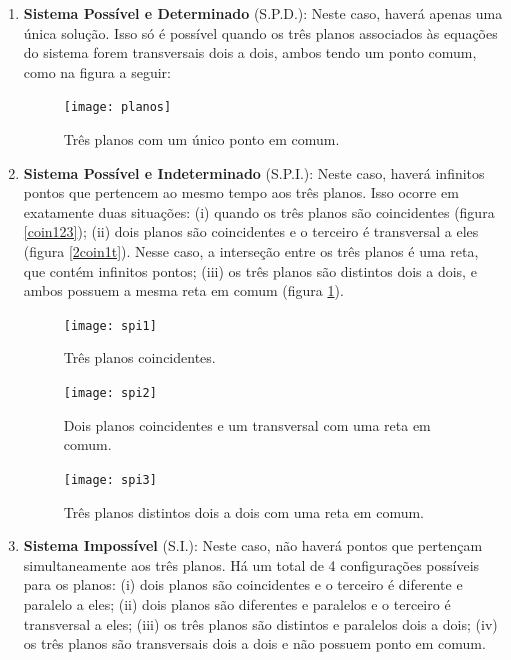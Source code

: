 \begin{enumerate}
\item{}
\textbf{Sistema Possível e Determinado} (S.P.D.): Neste caso, haverá apenas uma única solução. Isso só é possível quando os três planos associados às equações do sistema forem  transversais dois a dois, ambos tendo um ponto comum, como na figura a seguir:

\begin{figure}[H]
\centering
\noindent\texttt{[image: planos]}
\caption{Três planos com um único ponto em comum.}
\end{figure}

\item{} 
\textbf{Sistema Possível e Indeterminado} (S.P.I.): Neste caso, haverá infinitos pontos que pertencem ao mesmo tempo aos três planos. Isso ocorre em exatamente duas situações: (i) quando os três planos são coincidentes (figura \ref{coin123}); (ii) dois planos são coincidentes e o terceiro é transversal a eles (figura \ref{2coin1t}). Nesse caso, a interseção entre os três planos é uma reta, que contém infinitos pontos; (iii) os três planos são distintos dois a dois, e ambos possuem a mesma reta em comum (figura \ref{3disti}).

\begin{figure}[!htb]
\begin{minipage}[b]{0.30\linewidth}
\texttt{[image: spi1]}
\caption{Três planos coincidentes.}\label{coin123}
\end{minipage} \hfill
\begin{minipage}[b]{0.30\linewidth}
\texttt{[image: spi2]}
\caption{Dois planos coincidentes e um transversal com uma reta em comum.}\label{2coin1t}
\end{minipage} \hfill
\begin{minipage}[b]{0.30\linewidth}
\texttt{[image: spi3]}
\caption{Três planos distintos dois a dois com uma reta em comum.}\label{3disti}
\end{minipage}
\end{figure}

\item{} 
\textbf{Sistema Impossível} (S.I.): Neste caso, não haverá pontos que pertençam simultaneamente aos três planos. Há um total de 4 configurações possíveis para os planos: (i) dois planos são coincidentes e o terceiro é diferente e paralelo a eles; (ii) dois planos são diferentes e paralelos e o terceiro é transversal a eles; (iii) os três planos são distintos e paralelos dois a dois; (iv) os três planos são transversais dois a dois e não possuem ponto em comum. 


\end{enumerate}
